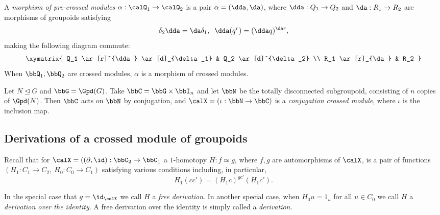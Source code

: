 \medskip 
{}
A \emph{morphism of pre-crossed modules} $\alpha : \calQ_1 \to \calQ_2$ 
is a pair  $\alpha = (\dda, \da)$, 
where $\dda : Q_1 \to Q_2$ and $\da : R_1 \to R_2$ 
are morphisms of groupoids satisfying
$$
\delta_2 \dda = \da \delta_1, \; \;
\dda(q^r) = (\dda  q)^{\da r},
$$
making the following diagram commute:
$$
\xymatrix{ 
  Q_1 \ar[r]^{\dda} \ar[d]_{\delta_1}
     & Q_2 \ar[d]^{\delta_2} \\
  R_1 \ar[r]_{\da}
     & R_2
}
$$
When $\bbQ_1,\bbQ_2$ are crossed modules, 
$\alpha$ is a morphism of crossed modules.


\begin{example}
Let $N \unlhd G$ and $\bbG = \Gpd(G)$. 
Take $\bbC = \bbG\times\bbI_n$ and let $\bbN$ be the totally disconnected 
subgroupoid, consisting of $n$ copies of $\Gpd(N)$. 
Then $\bbC$ acts on $\bbN$ by conjugation, 
and $\calX = (\iota : \bbN \to \bbC)$ is a \emph{conjugation crossed module}, 
where $\iota$ is the inclusion map. 
\end{example}



\newpage
\subsection{Derivations of a crossed module of groupoids}

Recall that for $\calX = ((\partial,\id) : \bbC_2 \to \bbC_1$ 
a $1$-homotopy $H : f \simeq g$, where $f,g$ are automorphisms of $\calX$, 
is a pair of functions $(H_1:C_1 \to C_2,~ H_0:C_0 \to C_1)$ 
satisfying various conditions including, in particular, 
\begin{equation} \label{eq:deriv-cond}
H_1(cc') = (H_1c)^{gc'}(H_1c').
\end{equation}

In the special case that $g=\id_{\calX}$ we call $H$ a \emph{free derivation}. 
In another special case, when $H_0u = 1_u$ for all $u \in C_0$ 
we call $H$ a \emph{derivation over the identity}. 
A free derivation over the identity is simply called a \emph{derivation}. 



